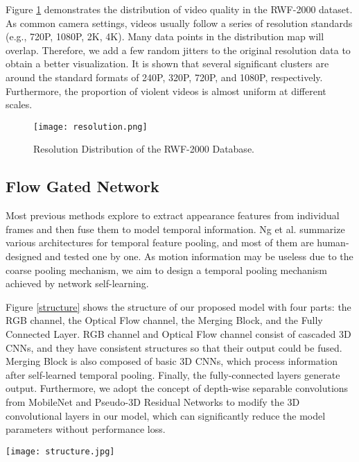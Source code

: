\documentclass[a4paper,conference]{IEEEtran}
\begin{document}
Figure \ref{resolution} demonstrates the distribution of video quality in the RWF-2000 dataset. As common camera settings, videos usually follow a  series of resolution standards (e.g., 720P, 1080P, 2K, 4K). Many data points in the distribution map will overlap. Therefore, we add a few random jitters to the original resolution data to obtain a better visualization. It is shown that several significant clusters are around the standard formats of 240P, 320P, 720P, and 1080P, respectively. Furthermore, the proportion of violent videos is almost uniform at different scales.

\begin{figure}[t]
  \centering
  \texttt{[image: resolution.png]}
  \caption{Resolution Distribution of the RWF-2000 Database.}
  \label{resolution}
\end{figure}

\subsection{Flow Gated Network}
\label{model_structure}
Most previous methods explore to extract appearance features from individual frames and then fuse them to model temporal information. Ng et al. \cite{r12} summarize various architectures for temporal feature pooling, and most of them are human-designed and tested one by one. As motion information may be useless due to the coarse pooling mechanism, we aim to design a temporal pooling mechanism achieved by network self-learning.


Figure \ref{structure} shows the structure of our proposed model with four parts: the RGB channel, the Optical Flow channel, the Merging Block, and the Fully Connected Layer. RGB channel and Optical Flow channel consist of cascaded 3D CNNs, and they have consistent structures so that their output could be fused. Merging Block is also composed of basic 3D CNNs, which process information after self-learned temporal pooling. Finally, the fully-connected layers generate output. Furthermore, we adopt the concept of depth-wise separable convolutions from MobileNet \cite{mobilenets} and Pseudo-3D Residual Networks \cite{p3d} to modify the 3D convolutional layers in our model, which can significantly reduce the model parameters without performance loss.


\begin{figure*}[t]
  \centering
  \texttt{[image: structure.jpg]}
  \caption{The structure of the Flow Gated Network.}
  \label{structure}
\end{figure*}
\end{document}
